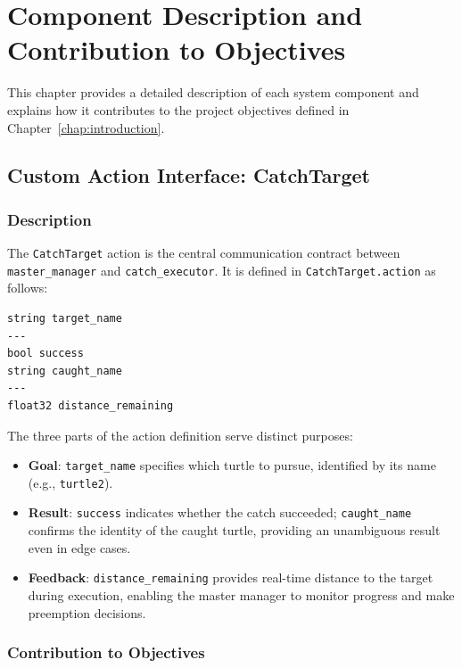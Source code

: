 \chapter{Component Description and Contribution to Objectives\label{chap:components}}

This chapter provides a detailed description of each system component and explains how it contributes to the project objectives defined in Chapter~\ref{chap:introduction}.

\section{Custom Action Interface: CatchTarget}

\subsection{Description}

The \texttt{CatchTarget} action is the central communication contract between \texttt{master\_manager} and \texttt{catch\_executor}. It is defined in \texttt{CatchTarget.action} as follows:

\begin{lstlisting}[language={},title={CatchTarget.action}]
string target_name
---
bool success
string caught_name
---
float32 distance_remaining
\end{lstlisting}

The three parts of the action definition serve distinct purposes:

\begin{itemize}
  \item \textbf{Goal}: \texttt{target\_name} specifies which turtle to pursue, identified by its name (e.g., \texttt{turtle2}).
  \item \textbf{Result}: \texttt{success} indicates whether the catch succeeded; \texttt{caught\_name} confirms the identity of the caught turtle, providing an unambiguous result even in edge cases.
  \item \textbf{Feedback}: \texttt{distance\_remaining} provides real-time distance to the target during execution, enabling the master manager to monitor progress and make preemption decisions.
\end{itemize}

\subsection{Contribution to Objectives}


